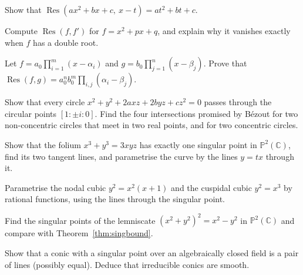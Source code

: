 \begin{exercise}[$\star$]\label{ex:reslinear}
Show that $\operatorname{Res}(ax^2+bx+c,\ x-t)=at^2+bt+c$.
\end{exercise}

\begin{exercise}[$\star$]\label{ex:discriminant}
Compute $\operatorname{Res}(f,f')$ for $f=x^2+px+q$, and explain why it vanishes exactly when $f$ has a double root.
\end{exercise}

\begin{exercise}[$\star\star$]\label{ex:resproduct}
Let $f=a_0\prod_{i=1}^m(x-\alpha_i)$ and $g=b_0\prod_{j=1}^n(x-\beta_j)$. Prove that $\operatorname{Res}(f,g)=a_0^nb_0^m\prod_{i,j}(\alpha_i-\beta_j)$.
\end{exercise}

\begin{exercise}[$\star\star$]\label{ex:circularpoints}
Show that every circle $x^2+y^2+2axz+2byz+cz^2=0$ passes through the circular points $[1:\pm i:0]$. Find the four intersections promised by B\'ezout
for two non-concentric circles that meet in two real points, and for two concentric circles.
\end{exercise}

\begin{exercise}[$\star$]\label{ex:folium}
Show that the folium $x^3+y^3=3xyz$ has exactly one singular point in $\mathbb P^2(\mathbb C)$, find its two tangent lines, and parametrise the
curve by the lines $y=tx$ through it.
\end{exercise}

\begin{exercise}[$\star$]\label{ex:nodalparam}
Parametrise the nodal cubic $y^2=x^2(x+1)$ and the cuspidal cubic $y^2=x^3$ by rational functions, using the lines through the singular point.
\end{exercise}

\begin{exercise}[$\star\star$]\label{ex:lemniscate}
Find the singular points of the lemniscate $(x^2+y^2)^2=x^2-y^2$ in $\mathbb P^2(\mathbb C)$ and compare with Theorem~\ref{thm:singbound}.
\end{exercise}

\begin{exercise}[$\star$]\label{ex:irreducibleconic}
Show that a conic with a singular point over an algebraically closed field is a pair of lines (possibly equal). Deduce that irreducible conics are smooth.
\end{exercise}


